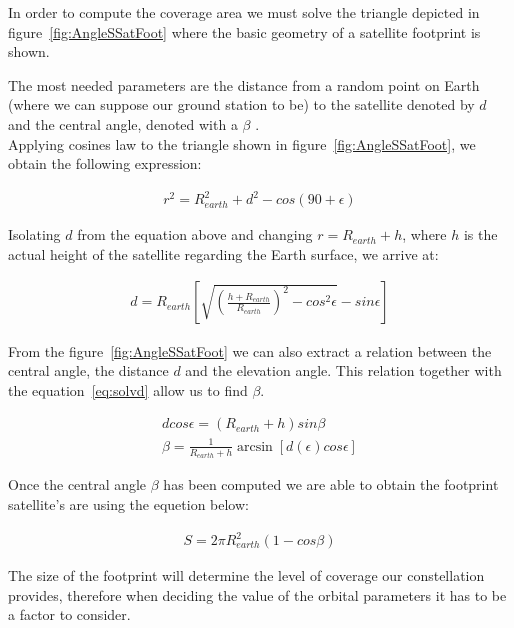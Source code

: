  In order to compute the coverage area we must solve the triangle depicted in figure~\ref{fig:AngleSSatFoot} where the basic geometry of a satellite footprint is shown.

 The most needed parameters are the distance from a random point on Earth (where we can suppose our ground station to be) to the satellite denoted by $d$ and the central angle, denoted with a $\beta$ . \\
 
 Applying cosines law to the triangle shown in figure~\ref{fig:AngleSSatFoot}, we obtain the following expression:
 
 \begin{equation} 
\begin{gathered}
r^2=R_{earth}^2+d^2-cos(90+\epsilon)
\end{gathered}
\label{eq:Tcos}
\end{equation}
 
 Isolating $d$ from the equation above and changing $r=R_{earth}+h$, where $h$ is the actual height of the satellite regarding the Earth surface, we arrive at:
 
\begin{equation}
\begin{gathered}
d=R_{earth}\left[ \sqrt{\left(\frac{h+R_{earth}}{R_{earth}}\right)^2-cos^2\epsilon}-sin\epsilon\right]
\end{gathered}
\label{eq:solvd}
\end{equation}

From the figure~\ref{fig:AngleSSatFoot} we can also extract a relation between the central angle, the distance $d$ and the elevation angle. This relation together with the equation~\ref{eq:solvd} allow us to find $\beta$. 

\begin{equation}
\begin{gathered}
d cos\epsilon=\left(R_{earth}+h\right)sin\beta \\
\beta=\frac{1}{R_{earth}+h}\arcsin\left[d(\epsilon)cos\epsilon\right]
\end{gathered}
\label{eq:solvb}
\end{equation}

Once the central angle $\beta$ has been computed we are able to obtain the footprint satellite's are using the equetion below:

\begin{equation}
\begin{gathered}
S=2 \pi R_{earth}^2 (1-cos\beta)
\end{gathered}
\label{eq:solvS}
\end{equation}

The size of the footprint will determine the level of coverage our constellation provides, therefore when deciding the value of the orbital parameters it has to be a factor to consider.
